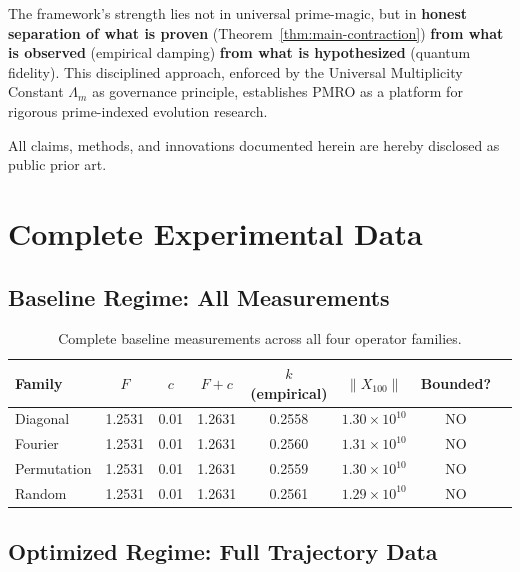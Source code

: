\documentclass[11pt,a4paper]{article}
\begin{document}
The framework's strength lies not in universal prime-magic, but in \textbf{honest separation of what is proven} (Theorem~\ref{thm:main-contraction}) \textbf{from what is observed} (empirical damping) \textbf{from what is hypothesized} (quantum fidelity). This disciplined approach, enforced by the Universal Multiplicity Constant \(\Lambda_m\) as governance principle, establishes PMRO as a platform for rigorous prime-indexed evolution research.

All claims, methods, and innovations documented herein are hereby disclosed as public prior art.

\appendix

\section{Complete Experimental Data}

\subsection{Baseline Regime: All Measurements}

\begin{table}[h]
\centering
\small
\begin{tabular}{lccccccc}
\toprule
\textbf{Family} & \textbf{\(F\)} & \textbf{\(c\)} & \textbf{\(F+c\)} & \textbf{\(k\) (empirical)} & \textbf{\(\|X_{100}\|\)} & \textbf{Bounded?} \\
\midrule
Diagonal & 1.2531 & 0.01 & 1.2631 & 0.2558 & \(1.30 \times 10^{10}\) & NO \\
Fourier & 1.2531 & 0.01 & 1.2631 & 0.2560 & \(1.31 \times 10^{10}\) & NO \\
Permutation & 1.2531 & 0.01 & 1.2631 & 0.2559 & \(1.30 \times 10^{10}\) & NO \\
Random & 1.2531 & 0.01 & 1.2631 & 0.2561 & \(1.29 \times 10^{10}\) & NO \\
\bottomrule
\end{tabular}
\caption{Complete baseline measurements across all four operator families.}
\end{table}

\subsection{Optimized Regime: Full Trajectory Data}
\end{document}
